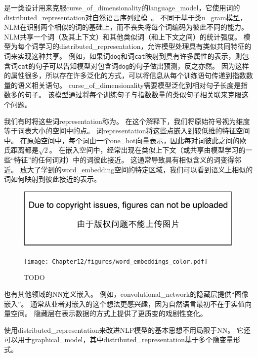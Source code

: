 是一类设计用来克服\gls{curse_of_dimensionality}的\gls{language_model}，它使用词的\gls{distributed_representation}对自然语言序列建模~\citep{BenDucVin01-small}。
不同于基于类\gls{n_gram}模型，\gls{NLM}在识别两个相似的词的基础上，而不丧失将每个词编码为彼此不同的能力。
\gls{NLM}共享一个词（及其上下文）和其他类似词（和上下文之间）的统计强度。
模型为每个词学习的\gls{distributed_representation}，允许模型处理具有类似共同特征的词来实现这种共享。
例如，如果词{\tt dog}和词{\tt cat}映射到具有许多属性的表示，则包含词{\tt cat}的句子可以告知模型对包含词{\tt dog}的句子做出预测，反之亦然。
因为这样的属性很多，所以存在许多泛化的方式，可以将信息从每个训练语句传递到指数数量的语义相关语句。
\gls{curse_of_dimensionality}需要模型泛化到相对句子长度是指数多的句子。
该模型通过将每个训练句子与指数数量的类似句子相关联来克服这个问题。


我们有时将这些词\gls{representation}称为。
在这个解释下，我们将原始符号视为维度等于词表大小的空间中的点。
词\gls{representation}将这些点嵌入到较低维的特征空间中。
在原始空间中，每个词由一个\gls{one_hot}向量表示，因此每对词彼此之间的欧氏距离都是$\sqrt{2}$。
在嵌入空间中，经常出现在类似上下文（或共享由模型学习的一些``特征''的任何词对）中的词彼此接近。
这通常导致具有相似含义的词变得邻近。
放大了学到的\gls{word_embedding}空间的特定区域，我们可以看到语义上相似的词如何映射到彼此接近的表示。

\begin{figure}[htp]
\centering
\ifOpenSource
\centerline{\includegraphics{figure.pdf}}
\else
\texttt{[image: Chapter12/figures/word\_embeddings\_color.pdf]}
\fi
\caption{TODO}
\label{fig:chap12_word_embeddings_color}
\end{figure}

也有其他领域的\gls{NN}定义嵌入。
例如，\gls{convolutional_network}的隐藏层提供``图像嵌入''。
通常从业者对嵌入的这个想法更感兴趣，因为自然语言最初不在于实值向量空间。
隐藏层在表示数据的方式上提供了更质变的戏剧性变化。


使用\gls{distributed_representation}来改进\gls{NLP}模型的基本思想不用局限于\gls{NN}。
它还可以用于\gls{graphical_model}，其中\gls{distributed_representation}基于多个隐变量形式。

